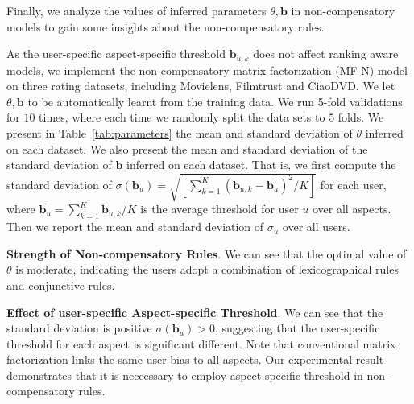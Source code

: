 \documentclass[letterpaper]{article} %
\begin{document}
Finally, we analyze the values of inferred parameters $\theta,\mathbf{b}$ in non-compensatory models to gain some insights about the non-compensatory rules. 

As the user-specific aspect-specific threshold $\mathbf{b}_{u,k}$ does not affect ranking aware models, we implement the non-compensatory matrix factorization (MF-N) model on three rating datasets, including Movielens, Filmtrust and CiaoDVD. We let $\theta,\mathbf{b}$ to be automatically learnt from the training data. We run 5-fold validations for $10$ times, where each time we randomly split the data sets to $5$ folds. We present in Table~\ref{tab:parameters} the mean and standard deviation of $\theta$ inferred on each dataset. We also present the mean and standard deviation of the standard deviation of $\mathbf{b}$ inferred on each dataset. That is, we first compute the standard deviation of $\sigma(\mathbf{b}_u)=\sqrt {[\sum_{k=1}^{K} (\mathbf{b}_{u,k}-\bar{\mathbf{b}_u})^2 /K]} $ for each user, where $\bar{\mathbf{b}_u}=\sum_{k=1}^K \mathbf{b}_{u,k} /K$ is the average threshold for user $u$ over all aspects. Then we report the mean and standard deviation of $\sigma_u$ over all users. 

\textbf{Strength of Non-compensatory Rules}. We can see that the optimal value of $\theta$ is moderate, indicating the users adopt a combination of lexicographical rules and conjunctive rules.  

\textbf{Effect of user-specific Aspect-specific Threshold}. We can see that the standard deviation is positive $\sigma(\mathbf{b}_{u})>0$, suggesting that the user-specific threshold for each aspect is significant different. Note that conventional matrix factorization links the same user-bias to all aspects. Our experimental result demonstrates that it is neccessary to employ aspect-specific threshold in non-compensatory rules. 
\begin{table}[htp]
\caption{Scale of the strength of lexicographical rule $\theta$ and user-specific aspect-specific threshold $\mathbf{b}_{u,k}$.}
\small
\centering
{}
\label{tab:parameters}
\end{table}
\end{document}
